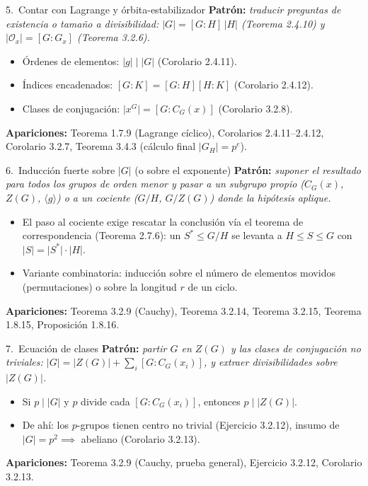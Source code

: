 \documentclass[11pt,twoside]{article}
\newcounter{result}[subsection]
\begin{document}
\begin{strategybox}{5.\ Contar con Lagrange y órbita-estabilizador}
\textbf{Patrón:} \textit{traducir preguntas de existencia o tamaño a divisibilidad: $\lvert G \rvert = [G:H]\,\lvert H \rvert$ (Teorema 2.4.10) y $\lvert \mathcal{O}_{x} \rvert = [G:G_{x}]$ (Teorema 3.2.6).}
\begin{itemize}[leftmargin=1.5em]
\item Órdenes de elementos: $\lvert g \rvert \mid \lvert G \rvert$ (Corolario 2.4.11).
\item Índices encadenados: $[G:K] = [G:H][H:K]$ (Corolario 2.4.12).
\item Clases de conjugación: $\lvert x^{G} \rvert = [G : C_{G}(x)]$ (Corolario 3.2.8).
\end{itemize}
\textbf{Apariciones:} Teorema 1.7.9 (Lagrange cíclico), Corolarios 2.4.11–2.4.12, Corolario 3.2.7, Teorema 3.4.3 (cálculo final $\lvert G_{H} \rvert = p^{e}$).
\end{strategybox}

\begin{strategybox}{6.\ Inducción fuerte sobre $\lvert G \rvert$ (o sobre el exponente)}
\textbf{Patrón:} \textit{suponer el resultado para todos los grupos de orden menor y pasar a un subgrupo propio ($C_{G}(x)$, $Z(G)$, $\langle g \rangle$) o a un cociente ($G/H$, $G/Z(G)$) donde la hipótesis aplique.}
\begin{itemize}[leftmargin=1.5em]
\item El paso al cociente exige rescatar la conclusión vía el teorema de correspondencia (Teorema 2.7.6): un $S^{\ast} \leq G/H$ se levanta a $H \leq S \leq G$ con $\lvert S \rvert = \lvert S^{\ast} \rvert \cdot \lvert H \rvert$.
\item Variante combinatoria: inducción sobre el número de elementos movidos (permutaciones) o sobre la longitud $r$ de un ciclo.
\end{itemize}
\textbf{Apariciones:} Teorema 3.2.9 (Cauchy), Teorema 3.2.14, Teorema 3.2.15, Teorema 1.8.15, Proposición 1.8.16.
\end{strategybox}

\begin{strategybox}{7.\ Ecuación de clases}
\textbf{Patrón:} \textit{partir $G$ en $Z(G)$ y las clases de conjugación no triviales: $\lvert G \rvert = \lvert Z(G) \rvert + \sum_{i} [G : C_{G}(x_{i})]$, y extraer divisibilidades sobre $\lvert Z(G) \rvert$.}
\begin{itemize}[leftmargin=1.5em]
\item Si $p \mid \lvert G \rvert$ y $p$ divide cada $[G:C_{G}(x_{i})]$, entonces $p \mid \lvert Z(G) \rvert$.
\item De ahí: los $p$-grupos tienen centro no trivial (Ejercicio 3.2.12), insumo de $\lvert G \rvert = p^{2} \implies$ abeliano (Corolario 3.2.13).
\end{itemize}
\textbf{Apariciones:} Teorema 3.2.9 (Cauchy, prueba general), Ejercicio 3.2.12, Corolario 3.2.13.
\end{strategybox}
\end{document}
